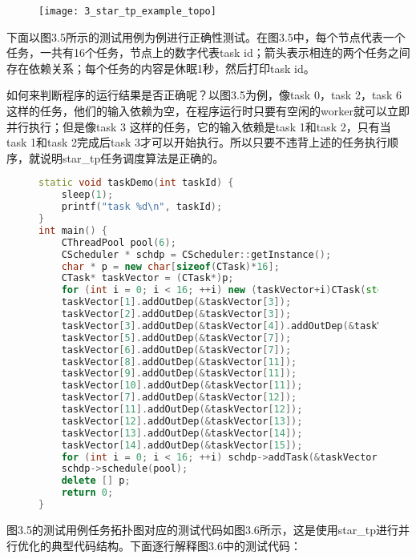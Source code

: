 \begin{figure}[!htbp]
    \centering
    \texttt{[image: 3\_star\_tp\_example\_topo]}
    \label{fig:3_star_tp_example_topo}
\end{figure}

下面以图3.5所示的测试用例为例进行正确性测试。在图3.5中，每个节点代表一个任务，一共有16个任务，节点上的数字代表task id；箭头表示相连的两个任务之间存在依赖关系；每个任务的内容是休眠1秒，然后打印task id。

如何来判断程序的运行结果是否正确呢？以图3.5为例，像task 0，task 2，task 6这样的任务，他们的输入依赖为空，在程序运行时只要有空闲的worker就可以立即并行执行；但是像task 3 这样的任务，它的输入依赖是task 1和task 2，只有当task 1和task 2完成后task 3才可以开始执行。所以只要不违背上述的任务执行顺序，就说明star\_tp任务调度算法是正确的。

\begin{figure}[!htbp]
    \centering
\begin{lstlisting}[language=c++,caption={}]
static void taskDemo(int taskId) {
    sleep(1);
    printf("task %d\n", taskId);
}
int main() {
    CThreadPool pool(6);
    CScheduler * schdp = CScheduler::getInstance();
    char * p = new char[sizeof(CTask)*16];
    CTask* taskVector = (CTask*)p;
    for (int i = 0; i < 16; ++i) new (taskVector+i)CTask(std::function<void()>(std::bind(taskDemo, i)));
    taskVector[1].addOutDep(&taskVector[3]);
    taskVector[2].addOutDep(&taskVector[3]);
    taskVector[3].addOutDep(&taskVector[4]).addOutDep(&taskVector[7]);
    taskVector[5].addOutDep(&taskVector[7]);
    taskVector[6].addOutDep(&taskVector[7]);
    taskVector[8].addOutDep(&taskVector[11]);
    taskVector[9].addOutDep(&taskVector[11]);
    taskVector[10].addOutDep(&taskVector[11]);
    taskVector[7].addOutDep(&taskVector[12]);
    taskVector[11].addOutDep(&taskVector[12]);
    taskVector[12].addOutDep(&taskVector[13]);
    taskVector[13].addOutDep(&taskVector[14]);
    taskVector[14].addOutDep(&taskVector[15]);
    for (int i = 0; i < 16; ++i) schdp->addTask(&taskVector[i]);
    schdp->schedule(pool);
    delete [] p;
    return 0;
}
\end{lstlisting}
    \label{fig:3_star_tp_example_code}
\end{figure}

图3.5的测试用例任务拓扑图对应的测试代码如图3.6所示，这是使用star\_tp进行并行优化的典型代码结构。下面逐行解释图3.6中的测试代码：

